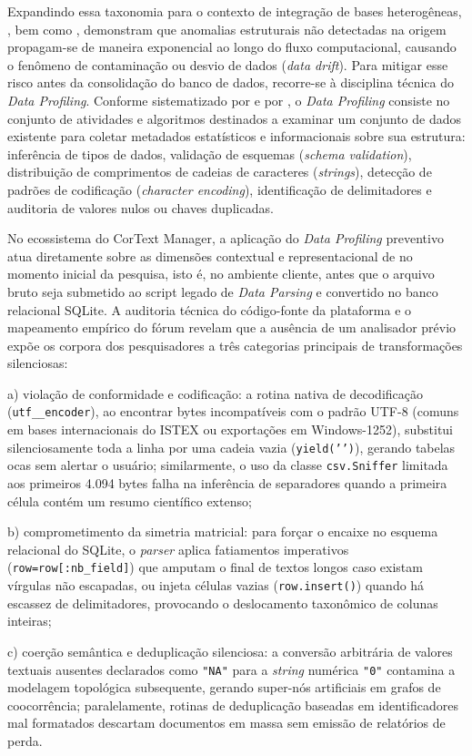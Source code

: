 \documentclass[
	oneside,
	a4paper,
	12pt,
	chapter=TITLE,
	section=TITLE,
	english,
	brazilian
]{abntex2}
\begin{document}
Expandindo essa taxonomia para o contexto de integração de bases heterogêneas, , bem como , demonstram que anomalias estruturais não detectadas na origem propagam-se de maneira exponencial ao longo do fluxo computacional, causando o fenômeno de contaminação ou desvio de dados (\textit{data drift}). Para mitigar esse risco antes da consolidação do banco de dados, recorre-se à disciplina técnica do \textit{Data Profiling}. Conforme sistematizado por  e por , o \textit{Data Profiling} consiste no conjunto de atividades e algoritmos destinados a examinar um conjunto de dados existente para coletar metadados estatísticos e informacionais sobre sua estrutura: inferência de tipos de dados, validação de esquemas (\textit{schema validation}), distribuição de comprimentos de cadeias de caracteres (\textit{strings}), detecção de padrões de codificação (\textit{character encoding}), identificação de delimitadores e auditoria de valores nulos ou chaves duplicadas.

No ecossistema do CorText Manager, a aplicação do \textit{Data Profiling} preventivo atua diretamente sobre as dimensões contextual e representacional de  no momento inicial da pesquisa, isto é, no ambiente cliente, antes que o arquivo bruto seja submetido ao script legado de \textit{Data Parsing} e convertido no banco relacional SQLite. A auditoria técnica do código-fonte da plataforma e o mapeamento empírico do fórum revelam que a ausência de um analisador prévio expõe os corpora dos pesquisadores a três categorias principais de transformações silenciosas:

\par\indent a) violação de conformidade e codificação: a rotina nativa de decodificação (\texttt{utf\_\_\allowbreak encoder}), ao encontrar bytes incompatíveis com o padrão UTF-8 (comuns em bases internacionais do ISTEX ou exportações em Windows-1252), substitui silenciosamente toda a linha por uma cadeia vazia (\texttt{yield('{}')}), gerando tabelas ocas sem alertar o usuário; similarmente, o uso da classe \texttt{csv.\allowbreak Sniffer} limitada aos primeiros 4.094 bytes falha na inferência de separadores quando a primeira célula contém um resumo científico extenso;
\par\indent b) comprometimento da simetria matricial: para forçar o encaixe no esquema relacional do SQLite, o \textit{parser} aplica fatiamentos imperativos (\texttt{row=row[:nb\_\allowbreak field]}) que amputam o final de textos longos caso existam vírgulas não escapadas, ou injeta células vazias (\texttt{row.\allowbreak insert()}) quando há escassez de delimitadores, provocando o deslocamento taxonômico de colunas inteiras;
\par\indent c) coerção semântica e deduplicação silenciosa: a conversão arbitrária de valores textuais ausentes declarados como \texttt{"NA"} para a \textit{string} numérica \texttt{"0"} contamina a modelagem topológica subsequente, gerando super-nós artificiais em grafos de coocorrência; paralelamente, rotinas de deduplicação baseadas em identificadores mal formatados descartam documentos em massa sem emissão de relatórios de perda.
\end{document}
